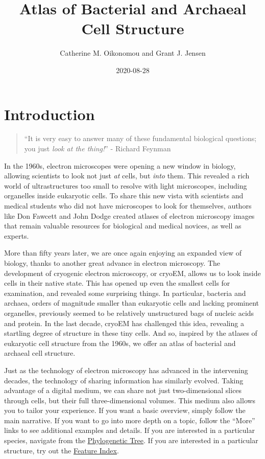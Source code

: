 \documentclass[]{tufte-book}
\title{Atlas of Bacterial and Archaeal Cell Structure}
\author{Catherine M. Oikonomou and Grant J. Jensen}
\date{2020-08-28}
\begin{document}
\maketitle



{
\setcounter{tocdepth}{1}
\tableofcontents
}

\hypertarget{introduction}{%
\chapter*{Introduction}\label{introduction}}

\begin{quote}
``It is very easy to answer many of these fundamental biological questions; you just \emph{look at the thing!}''
- Richard Feynman \citep{feynman1960}
\end{quote}

In the 1960s, electron microscopes were opening a new window in biology, allowing scientists to look not just \emph{at} cells, but \emph{into} them. This revealed a rich world of ultrastructures too small to resolve with light microscopes, including organelles inside eukaryotic cells. To share this new vista with scientists and medical students who did not have microscopes to look for themselves, authors like Don Fawcett \citep{fawcett1966} and John Dodge \citep{dodge1968} created atlases of electron microscopy images that remain valuable resources for biological and medical novices, as well as experts.

More than fifty years later, we are once again enjoying an expanded view of biology, thanks to another great advance in electron microscopy. The development of cryogenic electron microscopy, or cryoEM, allows us to look inside cells in their native state. This has opened up even the smallest cells for examination, and revealed some surprising things. In particular, bacteria and archaea, orders of magnitude smaller than eukaryotic cells and lacking prominent organelles, previously seemed to be relatively unstructured bags of nucleic acids and protein. In the last decade, cryoEM has challenged this idea, revealing a startling degree of structure in these tiny cells. And so, inspired by the atlases of eukaryotic cell structure from the 1960s, we offer an atlas of bacterial and archaeal cell structure.

Just as the technology of electron microscopy has advanced in the intervening decades, the technology of sharing information has similarly evolved. Taking advantage of a digital medium, we can share not just two-dimensional slices through cells, but their full three-dimensional volumes. This medium also allows you to tailor your experience. If you want a basic overview, simply follow the main narrative. If you want to go into more depth on a topic, follow the ``More'' links to see additional examples and details. If you are interested in a particular species, navigate from the \protect\hyperlink{tree}{Phylogenetic Tree}. If you are interested in a particular structure, try out the \protect\hyperlink{feature-index}{Feature Index}.
\end{document}
